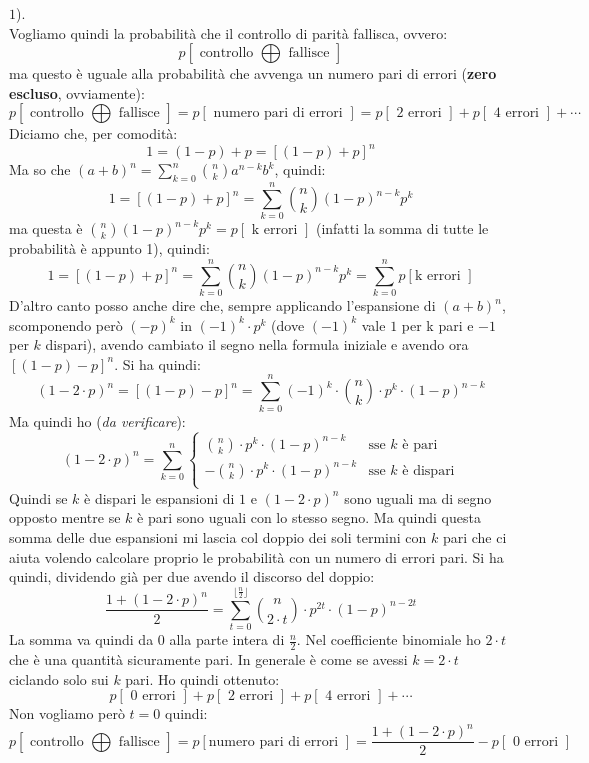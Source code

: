 \documentclass[a4paper,12pt, oneside]{book}
\begin{document}
$1$).\\ 
Vogliamo quindi la probabilità che il controllo di parità fallisca, ovvero:
\[p[\mbox{ controllo }\bigoplus \mbox{ fallisce }]\]
ma questo è uguale alla probabilità che avvenga un numero pari di errori
(\textbf{zero escluso}, ovviamente):
{\footnotesize{\[p[\mbox{ controllo }\bigoplus \mbox{ fallisce }]=p[\mbox{ numero
      pari di errori }]=p[\mbox{ 2 errori }]+p[\mbox{ 4 errori }]+\cdots \]}}
Diciamo che, per comodità:
\[1=(1-p)+p=[(1-p)+p]^n\]
Ma so che $(a+b)^n=\sum_{k=0}^n{{n}\choose{k}}a^{n-k}b^k$, quindi:
\[1=[(1-p)+p]^n=\sum_{k=0}^n{{n}\choose{k}}(1-p)^{n-k}p^k\]
ma questa è ${{n}\choose{k}}(1-p)^{n-k}p^k=p[\mbox{ k errori }]$ (infatti la
somma di tutte le probabilità è appunto 1), quindi:
\[1=[(1-p)+p]^n=\sum_{k=0}^n{{n}\choose{k}}(1-p)^{n-k}p^k=\sum_{k=0}^np[\mbox{
    k errori }]\]
D'altro canto posso anche dire che, sempre applicando l'espansione di $(a+b)^n$,
scomponendo però $(-p)^k$ in $(-1)^k\cdot p^k$ (dove $(-1)^k$ vale $1$ per k
pari e $-1$ per $k$ dispari), avendo cambiato il segno nella formula iniziale e
avendo ora $[(1-p)-p]^n$. Si ha quindi:
\[(1-2\cdot p)^n=[(1-p)-p]^n=\sum_{k=0}^n(-1)^k\cdot {{n}\choose{k}}\cdot
  p^k\cdot(1-p)^{n-k}\]
Ma quindi ho (\textit{da verificare}):
\[(1-2\cdot p)^n=\sum_{k=0}^n
  \begin{cases}
    {{n}\choose{k}}\cdot  p^k\cdot(1-p)^{n-k} &\mbox{sse $k$ è pari}\\
    -{{n}\choose{k}}\cdot  p^k\cdot(1-p)^{n-k} &\mbox{sse $k$ è dispari}\\
  \end{cases}
\]
Quindi se $k$ è dispari le espansioni di $1$ e $(1-2\cdot p)^n$ sono uguali ma
di segno opposto mentre se $k$ è pari sono uguali con lo stesso segno. Ma quindi
questa somma delle due espansioni mi lascia col doppio dei soli termini con $k$
pari che ci aiuta volendo calcolare proprio le probabilità con un numero di
errori pari. Si ha quindi, dividendo già per due avendo il discorso del doppio:
\[\frac{1+(1-2\cdot p)^n}{2}=\sum_{t=0}^{\lfloor \frac{n}{2}\rfloor}
  {{n}\choose{2\cdot t}}\cdot p^{2t}\cdot(1-p)^{n-2t}\]
La somma va quindi da 0 alla parte intera di $\frac{n}{2}$. Nel coefficiente
binomiale ho $2\cdot t$ che è una quantità sicuramente pari. In generale è come
se avessi $k=2\cdot t$ ciclando solo sui $k$ pari. Ho quindi ottenuto:
\[p[\mbox{ 0 errori }]+p[\mbox{ 2 errori }]+p[\mbox{ 4 errori }]+\cdots \]
Non vogliamo però $t=0$ quindi:
{\footnotesize{\[p[\mbox{ controllo }\bigoplus \mbox{ fallisce }]=p[\mbox{
        numero pari di errori }]=\frac{1+(1-2\cdot 
    p)^n}{2}-p[\mbox{ 0 errori }]\]}}
\end{document}

